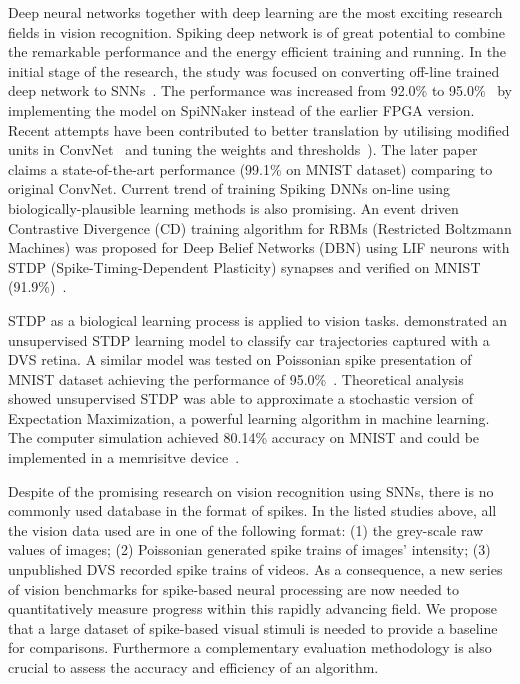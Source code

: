Deep neural networks together with deep learning are the most exciting research fields in vision recognition.
Spiking deep network is of great potential to combine the remarkable performance and the energy efficient training and running.
In the initial stage of the research, the study was focused on converting off-line trained deep network to SNNs~\citep{o2013real}.
The performance was increased from 92.0\% to 95.0\%~\citep{Stromatias2015scalable} by implementing the model on SpiNNaker instead of the earlier FPGA version.
Recent attempts have been contributed to better translation by utilising modified units in ConvNet~\citep{cao2015spiking} and tuning the weights and thresholds~\citep{Diehl2015fast}).
The later paper claims a state-of-the-art performance (99.1\% on MNIST dataset) comparing to original ConvNet.
Current trend of training Spiking DNNs on-line using biologically-plausible learning methods is also promising.
An event driven Contrastive Divergence (CD) training algorithm for RBMs (Restricted Boltzmann Machines) was proposed for Deep Belief Networks (DBN) using LIF neurons with STDP (Spike-Timing-Dependent Plasticity) synapses and verified on MNIST (91.9\%)~\citep{neftci2013event}.

STDP as a biological learning process is applied to vision tasks.
\cite{bichler2012extraction} demonstrated an unsupervised STDP learning model to classify car trajectories captured with a DVS retina. 
A similar model was tested on Poissonian spike presentation of MNIST dataset achieving the performance of 95.0\%~\citep{Diehl2015unsupervised}.
Theoretical analysis~\citep{nessler2013bayesian} showed unsupervised STDP was able to approximate a stochastic version of Expectation Maximization, a powerful learning algorithm in machine learning.
The computer simulation achieved 80.14\% accuracy on MNIST and could be implemented in a memrisitve device~\citep{bill2014compound}. 

Despite of the promising research on vision recognition using SNNs, there is no commonly used database in the format of spikes.
In the listed studies above, all the vision data used are in one of the following format:
(1) the grey-scale raw values of images;
(2) Poissonian generated spike trains of images' intensity;
(3) unpublished DVS recorded spike trains of videos.
As a consequence, a new series of vision benchmarks for spike-based neural processing are now needed to quantitatively measure progress within this rapidly advancing field.
We propose that a large dataset of spike-based visual stimuli is needed to provide a baseline for comparisons.
Furthermore a complementary evaluation methodology is also crucial to assess the accuracy and efficiency of an algorithm.

